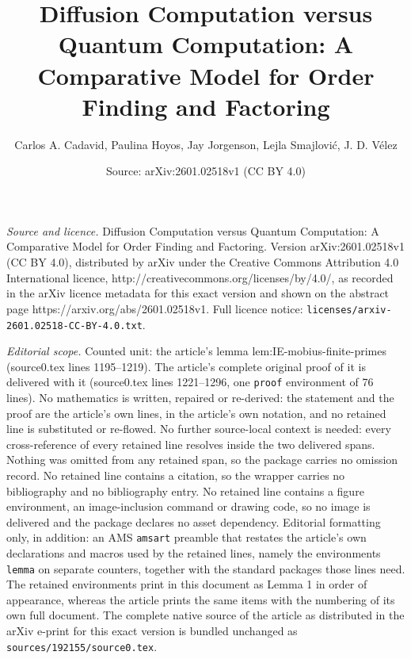 \documentclass[10pt,a4paper]{amsart}
\title{Diffusion Computation versus Quantum Computation: A Comparative Model for Order Finding and Factoring}
\author{Carlos A. Cadavid, Paulina Hoyos, Jay Jorgenson, Lejla Smajlovi\'c, J. D. V\'elez}
\date{Source: arXiv:2601.02518v1 (CC BY 4.0)}
\begin{document}
\maketitle

\noindent\emph{Source and licence.} Diffusion Computation versus Quantum Computation: A Comparative Model for Order Finding and Factoring. Version arXiv:2601.02518v1 (CC BY 4.0), distributed by arXiv under the Creative Commons Attribution 4.0 International licence, http://creativecommons.org/licenses/by/4.0/, as recorded in the arXiv licence metadata for this exact version and shown on the abstract page https://arxiv.org/abs/2601.02518v1. Full licence notice: \texttt{licenses/arxiv-2601.02518-CC-BY-4.0.txt}.\par\smallskip

\noindent\textit{Editorial scope.} Counted unit: the article's lemma lem:IE-mobius-finite-primes (source0.tex lines 1195--1219). The article's complete original proof of it is delivered with it (source0.tex lines 1221--1296, one \texttt{proof} environment of 76 lines). No mathematics is written, repaired or re-derived: the statement and the proof are the article's own lines, in the article's own notation, and no retained line is substituted or re-flowed.  No further source-local context is needed: every cross-reference of every retained line resolves inside the two delivered spans.  Nothing was omitted from any retained span, so the package carries no omission record.  No retained line contains a citation, so the wrapper carries no bibliography and no bibliography entry.  No retained line contains a figure environment, an image-inclusion command or drawing code, so no image is delivered and the package declares no asset dependency.  Editorial formatting only, in addition: an AMS \texttt{amsart} preamble that restates the article's own declarations and macros used by the retained lines, namely the environments \texttt{lemma} on separate counters, together with the standard packages those lines need.  The retained environments print in this document as Lemma 1 in order of appearance, whereas the article prints the same items with the numbering of its own full document.  The complete native source of the article as distributed in the arXiv e-print for this exact version is bundled unchanged as \texttt{sources/192155/source0.tex}.
\end{document}
